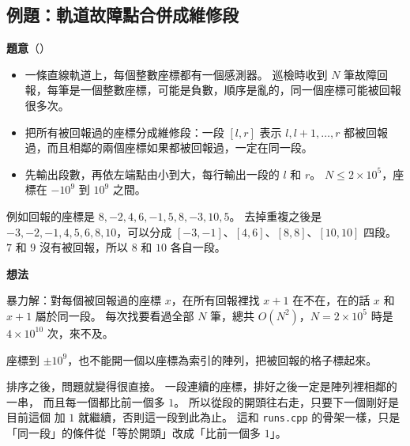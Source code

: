 \subsection{例題：軌道故障點合併成維修段}
\label{sec:srt-ex-faults}

\textbf{題意}（）

\begin{itemize}
\item 一條直線軌道上，每個整數座標都有一個感測器。 巡檢時收到 $N$ 筆故障回
報，每筆是一個整數座標，可能是負數，順序是亂的，同一個座標可能被回報很多次。
\item 把所有被回報過的座標分成維修段：一段 $[l, r]$ 表示 $l, l + 1, \ldots,
r$ 都被回報過，而且相鄰的兩個座標如果都被回報過，一定在同一段。
\item 先輸出段數，再依左端點由小到大，每行輸出一段的 $l$ 和 $r$。
$N \le 2 \times 10^5$，座標在 $-10^9$ 到 $10^9$ 之間。
\end{itemize}

例如回報的座標是 $8, -2, 4, 6, -1, 5, 8, -3, 10, 5$。 去掉重複之後是 $-3,
-2, -1, 4, 5, 6, 8, 10$，可以分成 $[-3, -1]$、$[4, 6]$、$[8, 8]$、$[10, 10]$
四段。 $7$ 和 $9$ 沒有被回報，所以 $8$ 和 $10$ 各自一段。

\begin{center}
\label{fig:srt-faults}
\end{center}

\textbf{想法}

暴力解：對每個被回報過的座標 $x$，在所有回報裡找 $x + 1$ 在不在，在的話 $x$
和 $x + 1$ 屬於同一段。 每次找要看過全部 $N$ 筆，總共 $O(N^2)$，$N = 2 \times
10^5$ 時是 $4 \times 10^{10}$ 次，來不及。

座標到 $\pm 10^9$，也不能開一個以座標為索引的陣列，把被回報的格子標起來。

排序之後，問題就變得很直接。 一段連續的座標，排好之後一定是陣列裡相鄰的一串，
而且每一個都比前一個多 $1$。 所以從段的開頭往右走，只要下一個剛好是目前這個
加 $1$ 就繼續，否則這一段到此為止。 這和 \texttt{runs.cpp} 的骨架一樣，只是
「同一段」的條件從「等於開頭」改成「比前一個多 $1$」。

